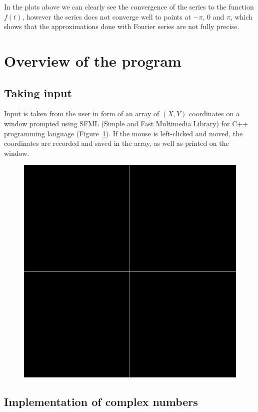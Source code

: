 \documentclass[titlepage]{article}
\begin{document}
    In the plots above we can clearly see the convergence of the series to the
    function $f(t)$, however the series does not converge well to points at
    $-\pi$, $0$ and $\pi$, which shows that the approximations done with Fourier
    series are not fully precise.


\section{Overview of the program} 

\subsection{Taking input}
    
    Input is taken from the user in form of an array of $(X,Y)$ coordinates on 
    a window prompted using SFML (Simple and Fast Multimedia Library) for C++ 
    programming language (Figure~\ref{fig:input_window}). If the mouse is 
    left-clicked and moved, the coordinates
    are recorded and saved in the array, as well as printed on the window. 
    \begin{figure}[H]
        \caption{}
        \centering
        \includegraphics[width=0.3\linewidth]{input_window}
        \label{fig:input_window}
    \end{figure}

\subsection{Implementation of complex numbers}
\end{document}
